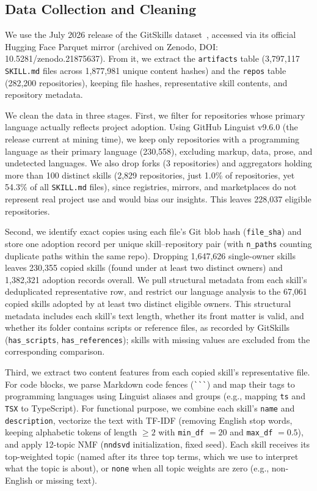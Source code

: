 \subsection{Data Collection and Cleaning}
We use the July 2026 release of the GitSkills dataset~\cite{destefanis2027gitskills}, accessed via its official Hugging Face Parquet mirror (archived on Zenodo, DOI: 10.5281/zenodo.21875637). From it, we extract the \texttt{artifacts} table (3,797,117 \texttt{SKILL.md} files across 1,877,981 unique content hashes) and the \texttt{repos} table (282,200 repositories), keeping file hashes, representative skill contents, and repository metadata.

We clean the data in three stages. First, we filter for repositories whose primary language actually reflects project adoption. Using GitHub Linguist v9.6.0 (the release current at mining time), we keep only repositories with a programming language as their primary language (230,558), excluding markup, data, prose, and undetected languages. We also drop forks (3 repositories) and aggregators holding more than 100 distinct skills (2,829 repositories, just 1.0\% of repositories, yet 54.3\% of all \texttt{SKILL.md} files), since registries, mirrors, and marketplaces do not represent real project use and would bias our insights. This leaves 228,037 eligible repositories.

Second, we identify exact copies using each file's Git blob hash (\texttt{file\_sha}) and store one adoption record per unique skill--repository pair (with \texttt{n\_paths} counting duplicate paths within the same repo). Dropping 1,647,626 single-owner skills leaves 230,355 copied skills (found under at least two distinct owners) and 1,382,321 adoption records overall. We pull structural metadata from each skill's deduplicated representative row, and restrict our language analysis to the 67,061 copied skills adopted by at least two distinct eligible owners. This structural metadata includes each skill's text length, whether its front matter is valid, and whether its folder contains scripts or reference files, as recorded by GitSkills (\texttt{has\_scripts}, \texttt{has\_references}); skills with missing values are excluded from the corresponding comparison.

Third, we extract two content features from each copied skill's representative file. For code blocks, we parse Markdown code fences (\texttt{\`{}\`{}\`{}}) and map their tags to programming languages using Linguist aliases and groups (e.g., mapping \texttt{ts} and \texttt{TSX} to TypeScript). For functional purpose, we combine each skill's \texttt{name} and \texttt{description}, vectorize the text with TF-IDF (removing English stop words, keeping alphabetic tokens of length $\ge 2$ with \texttt{min\_df} $= 20$ and \texttt{max\_df} $= 0.5$), and apply 12-topic NMF (\texttt{nndsvd} initialization, fixed seed). Each skill receives its top-weighted topic (named after its three top terms, which we use to interpret what the topic is about), or \texttt{none} when all topic weights are zero (e.g., non-English or missing text).

